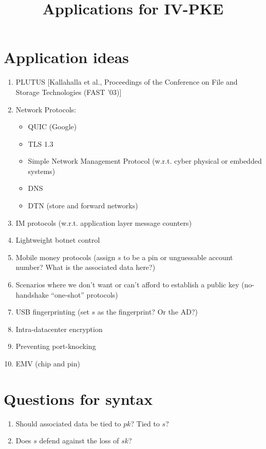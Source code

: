 \documentclass[11pt, pdftex]{article}
\title{Applications for IV-PKE}
\author{}
\date{}
\begin{document}
\maketitle

\section{Application ideas}
\begin{enumerate}
\item PLUTUS  [Kallahalla et al., Proceedings of the Conference on File and Storage Technologies (FAST '03)]
\item Network Protocols:
\begin{itemize}
\item QUIC (Google)
\item TLS 1.3
\item Simple Network Management Protocol (w.r.t. cyber physical or embedded systems)
\item DNS
\item DTN (store and forward networks)
\end{itemize}

\item IM protocols (w.r.t. application layer message counters)

\item Lightweight botnet control

\item Mobile money protocols (assign $s$ to be a pin or unguessable account number?  What is the associated data here?)

\item Scenarios where we don't want or can't afford to establish a public key (no-handshake ``one-shot'' protocols)

\item USB fingerprinting (set $s$ as the fingerprint?  Or the AD?)

\item Intra-datacenter encryption

\item  Preventing port-knocking

\item EMV (chip and pin)
\end{enumerate}


\section{Questions for syntax}
\begin{enumerate}
\item Should associated data be tied to $pk$?  Tied to $s$?

\item Does $s$ defend against the loss of $sk$?
\end{enumerate}
\end{document}
